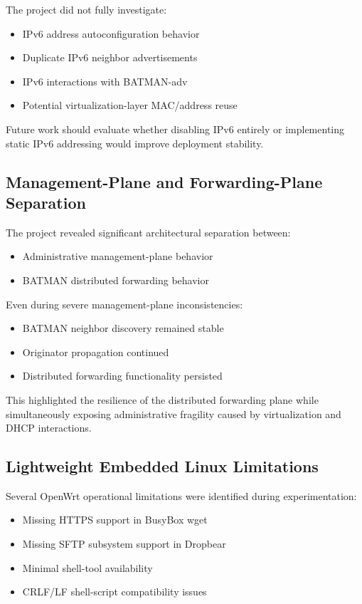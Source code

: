 \documentclass[conference]{IEEEtran}
\begin{document}
The project did not fully investigate:

\begin{itemize}
    \item IPv6 address autoconfiguration behavior
    \item Duplicate IPv6 neighbor advertisements
    \item IPv6 interactions with BATMAN-adv
    \item Potential virtualization-layer MAC/address reuse
\end{itemize}

Future work should evaluate whether disabling IPv6 entirely or implementing static IPv6 addressing would improve deployment stability.

\subsection{Management-Plane and Forwarding-Plane Separation}

The project revealed significant architectural separation between:

\begin{itemize}
    \item Administrative management-plane behavior
    \item BATMAN distributed forwarding behavior
\end{itemize}

Even during severe management-plane inconsistencies:

\begin{itemize}
    \item BATMAN neighbor discovery remained stable
    \item Originator propagation continued
    \item Distributed forwarding functionality persisted
\end{itemize}

This highlighted the resilience of the distributed forwarding plane while simultaneously exposing administrative fragility caused by virtualization and DHCP interactions.

\subsection{Lightweight Embedded Linux Limitations}

Several OpenWrt operational limitations were identified during experimentation:

\begin{itemize}
    \item Missing HTTPS support in BusyBox wget
    \item Missing SFTP subsystem support in Dropbear
    \item Minimal shell-tool availability
    \item CRLF/LF shell-script compatibility issues
\end{itemize}
\end{document}
